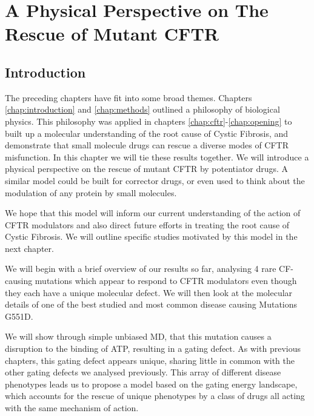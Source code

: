 \chapter{A Physical Perspective on The Rescue of Mutant CFTR}
\label{chap:perspective}

\section{Introduction}

The preceding chapters have fit into some broad themes. Chapters \ref{chap:introduction} and \ref{chap:methods} outlined a philosophy of biological physics. This philosophy was applied in chapters \ref{chap:cftr}-\ref{chap:opening} to built up a molecular understanding of the root cause of Cystic Fibrosis, and demonstrate that small molecule drugs can rescue a diverse modes of CFTR misfunction. In this chapter we will tie these results together. We will introduce a physical perspective on the rescue of mutant CFTR by potentiator drugs. A similar model could be built for corrector drugs, or even used to think about the modulation of any protein by small molecules.

We hope that this model will inform our current understanding of the action of CFTR modulators and also direct future efforts in treating the root cause of Cystic Fibrosis. We will outline specific studies motivated by this model in the next chapter.

We will begin with a brief overview of our results so far, analysing 4 rare CF-causing mutations which appear to respond to CFTR modulators even though they each have a unique molecular defect. We will then look at the molecular details of one of the best studied and most common disease causing Mutations G551D. 

We will show through simple unbiased MD, that this mutation causes a disruption to the binding of ATP, resulting in a gating defect. As with previous chapters, this gating defect appears unique, sharing little in common with the other gating defects we analysed previously. This array of different disease phenotypes leads us to propose a model based on the gating energy landscape, which accounts for the rescue of unique phenotypes by a class of drugs all acting with the same mechanism of action. 

